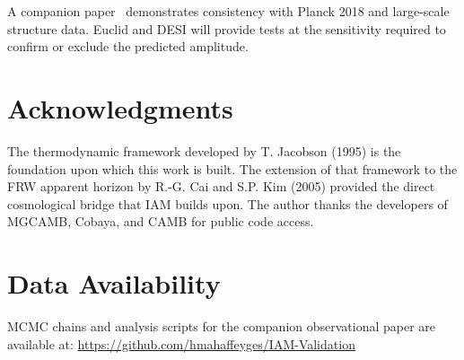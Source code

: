 \documentclass[11pt]{article}
\begin{document}
A companion paper~\citep{Mahaffey2026obs} demonstrates consistency with
Planck 2018 and large-scale structure data.  Euclid and DESI will provide
tests at the sensitivity required to confirm or exclude the predicted
amplitude.


\section*{Acknowledgments}

The thermodynamic framework developed by T. Jacobson (1995) is the foundation upon which this work is built. The extension of that framework to the FRW apparent horizon by R.-G. Cai and S.P. Kim (2005) provided the direct cosmological bridge that IAM builds upon. The author thanks the developers of MGCAMB, Cobaya, and CAMB for public code access.  

\section*{Data Availability}

MCMC chains and analysis scripts for the companion observational paper are
available at:
\url{https://github.com/hmahaffeyges/IAM-Validation}
\end{document}
